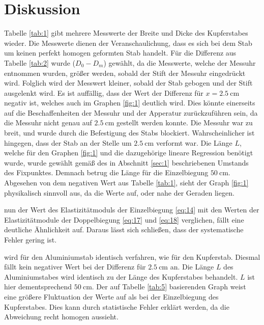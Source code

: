 \section{Diskussion}\justifying
{}\justifying Tabelle \ref{tab:1} gibt mehrere Messwerte der Breite und Dicke des Kupferstabes wieder. Die Messwerte dienen der Veranschaulichung, dass es sich
bei dem Stab um keinen perfekt homogen geformten Stab handelt. Für die Differenz aus Tabelle \ref{tab:2} wurde ($D_0-D_m$) gewählt, da die Messwerte, 
welche der Messuhr entnommen wurden, größer werden, sobald der Stift der Messuhr eingedrückt wird. Folglich wird der Messwert kleiner, sobald der 
Stab gebogen und der Stift ausgelenkt wird. Es ist auffällig, dass der Wert der Differenz für  $x = \SI{2.5}{\centi\meter}$ negativ ist, 
welches auch im Graphen \ref{fig:1} deutlich wird. Dies könnte einerseits auf die Beschaffenheiten der Messuhr und der Apperatur zurückzuführen 
sein, da die Messuhr nicht genau auf $\SI{2.5}{\centi\meter}$ gestellt werden konnte. Die Messuhr war zu breit, und wurde durch die Befestigung des 
Stabs blockiert. Wahrscheinlicher ist hingegen, dass der Stab an der Stelle um $\SI{2.5}{\centi\meter}$ verformt war. Die Länge $L$, welche für den 
Graphen \ref{fig:1} und die dazugehörige lineare Regression benötigt wurde, wurde gewählt gemäß des in Abschnitt \ref{sec:1} beschriebenen Umstands des 
Fixpunktes. Demnach betrug die Länge für die Einzelbiegung $\SI{50}{\centi\meter}$. Abgesehen von dem negativen Wert aus Tabelle \ref{tab:1}, sieht 
der Graph \ref{fig:1} physikalisch sinnvoll aus, da die Werte auf, oder nahe der Geraden liegen. 

\justifying nun der Wert des Elastizitätmoduls der Einzelbiegung \eqref{eq:14} mit den Werten der Elastizitätmodule der Doppelbiegung \eqref{eq:17}
und \eqref{eq:18} verglichen, fällt eine deutliche Ähnlichkeit auf. Daraus lässt sich schließen, dass der systematische Fehler gering ist.


\justifying wird für den Aluminiumstab identisch verfahren, wie für den Kupferstab. 
Diesmal fällt kein negativer Wert bei der Differenz für 
$\SI{2.5}{\centi\meter}$ an. Die Länge $L$ des Aluminiumstabes wird identisch zu der Länge des Kupferstabes behandelt. $L$ ist hier dementsprechend
$\SI{50}{\centi\meter}$. Der auf Tabelle \ref{tab:5} basierenden Graph weist eine größere Fluktuation der Werte auf als bei der Einzelbiegung 
des Kupferstabes. Dies kann durch statistische Fehler erklärt werden, da die Abweichung recht homogen aussieht.

